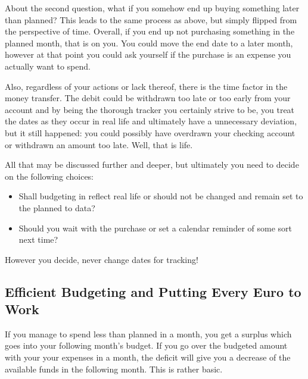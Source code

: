 About the second question, what if you somehow end up buying something later than planned?
This leads to the same process as above, but simply flipped from the perspective of time.
Overall, if you end up not purchasing something in the planned month, that is on you.
You could move the end date to a later month, however at that point you could ask yourself if the purchase is an expense you actually want to spend.

Also, regardless of your actions or lack thereof, there is the time factor in the money transfer.
The debit could be withdrawn too late or too early from your account and by being the thorough tracker you certainly strive to be, you treat the dates as they occur in real life and ultimately have a unnecessary deviation, but it still happened: you could possibly have overdrawn your checking account or withdrawn an amount too late.
Well, that is life.

All that may be discussed further and deeper, but ultimately you need to decide on the following choices:
\begin{itemize}
	\item Shall budgeting in \tfn reflect real life or should \tfn not be changed and remain set to the planned to data?
	\item Should you wait with the purchase or set a calendar reminder of some sort next time?
\end{itemize}
\begin{specialnote}
	However you decide, never change dates for tracking!
\end{specialnote}

\subsection{Efficient Budgeting and Putting Every Euro to Work}
\label{subsec:efficient-budgeting}

If you manage to spend less than planned in a month, you get a surplus which goes into your following month's budget.
If you go over the budgeted amount with your your expenses in a month, the deficit will give you a decrease of the available funds in the following month.
This is rather basic.

